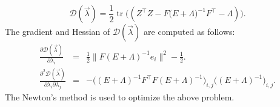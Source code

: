 \documentclass[12pt]{article}
\DeclareMathOperator{\tr}{tr}
\begin{document}
\begin{appendices}
\begin{equation}
    \label{eqn::dual}
    \mathcal{D} (\vec{\lambda}) = \frac{1}{2} \tr \big(( Z^\intercal Z -  F \big( E + \Lambda \big)^{-1} F^\intercal - \Lambda) \big).
  \end{equation}
  The gradient and Hessian of $\mathcal{D} (\vec{\lambda})$ are computed as follows:
  \begin{eqnarray}
    \frac{\partial \mathcal{D} (\vec{\lambda})}{\partial \lambda_i} &= & \frac{1}{2} \| F ( E + \Lambda )^{-1} e_i \big\|^2 - \frac{1}{2}.\\
    \frac{\partial^2 \mathcal{D} (\vec{\lambda})}{\partial \lambda_i \partial \lambda_j} &=& - \big( ( E + \Lambda )^{-1} F^\intercal F ( E + \Lambda )^{-1} \big)_{i, j} \big( (E + \Lambda )^{-1} \big)_{i,j}.
  \end{eqnarray}
  The Newton's method is used to optimize the above problem.


\end{appendices}
\end{document}
